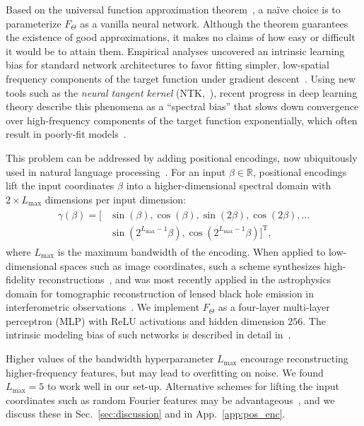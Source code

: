 \documentclass[nohyperref]{article}
\theoremstyle{plain}
\theoremstyle{definition}
\theoremstyle{remark}
\begin{document}
Based on the universal function approximation theorem~\cite{hornik1989multilayer}, a na\"ive choice is to parameterize \(F_\Theta\) as a vanilla neural network. Although the theorem guarantees the existence of good approximations, it makes no claims of how easy or difficult it would be to attain them. Empirical analyses uncovered an intrinsic learning bias for standard network architectures to favor fitting simpler, low-spatial frequency components of the target function under gradient descent~\cite{zhang2021understanding,arpit2017closer,ulyanov2018deep,rahaman2019spectral}.  Using new tools such as the \textit{neural tangent kernel} (NTK,~\citealt{jacot2018neural}), recent progress in deep learning theory describe this phenomena as a ``spectral bias'' that slows down convergence over high-frequency components of the target function exponentially, which often result in poorly-fit models~\cite{rahaman2019spectral,cao2019towards}.

This problem can be addressed by adding positional encodings, now ubiquitously used in natural language processing~\cite{gehring2017convolutional,vaswani2017attention,devlin2018bert}. 
For an input \(\beta\in \mathbb R\), positional encodings lift the input coordinates \(\beta\) into a higher-dimensional spectral domain with \(2 \times L_\mathrm{max}\) dimensions per input dimension:
\begin{align}
\begin{split}
\gamma(\beta)=\big[&\sin (\beta), \cos (\beta), \sin(2 \beta), \cos(2 \beta), \ldots  \\
&\sin \left(2^{L_\mathrm{max}-1} \beta\right), \cos \left(2^{L_\mathrm{max}-1} \beta\right)\big]^{\mathrm{T}},
\label{eq:pos_enc}
\end{split}
\end{align}
where $L_\mathrm{max}$ is the maximum bandwidth of the encoding. When applied to low-dimensional spaces such as image coordinates, such a scheme synthesizes high-fidelity reconstructions~\cite{mildenhall2020nerf}, and was most recently applied in the astrophysics domain for tomographic reconstruction of lensed black hole emission in interferometric observations~\citet{levis2022gravitationally}. 
We implement $F_\Theta$ as a four-layer multi-layer perceptron (MLP) with ReLU activations and hidden dimension \(256\). The intrinsic modeling bias of such networks is described in detail in~\cite{tancik2020fourier}.

Higher values of the bandwidth hyperparameter $L_\mathrm{max}$ encourage reconstructing higher-frequency features, but may lead to overfitting on noise. We found $L_\mathrm{max}=5$ to work well in our set-up. Alternative schemes for lifting the input coordinates such as random Fourier features may be advantageous~\cite{Rahimi2008kitchen}, and we discuss these in Sec.~\ref{sec:discussion} and in App.~\ref{app:pos_enc}.
\end{document}
